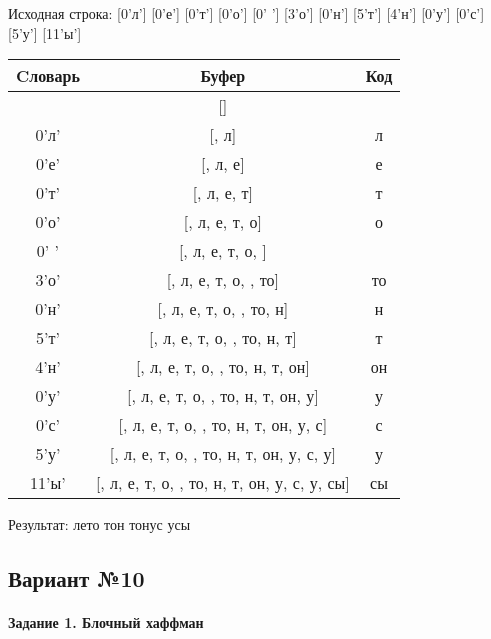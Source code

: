 \documentclass[a4paper, 12pt]{article}
\begin{document}
Исходная строка: [0'л'] [0'е'] [0'т'] [0'о'] [0' '] [3'о'] [0'н'] [5'т'] [4'н'] [0'у'] [0'с'] [5'у'] [11'ы']\\
\begin{table}[h!]
\centering
\begin{tabular}{|c|c|c|}
\hline
 Cловарь & Буфер & Код  \\ \hline
 & [] & 
\\ \hline
0'л' & [, л] & л
\\ \hline
0'е' & [, л, е] & е
\\ \hline
0'т' & [, л, е, т] & т
\\ \hline
0'о' & [, л, е, т, о] & о
\\ \hline
0' ' & [, л, е, т, о,  ] &  
\\ \hline
3'о' & [, л, е, т, о,  , то] & то
\\ \hline
0'н' & [, л, е, т, о,  , то, н] & н
\\ \hline
5'т' & [, л, е, т, о,  , то, н,  т] &  т
\\ \hline
4'н' & [, л, е, т, о,  , то, н,  т, он] & он
\\ \hline
0'у' & [, л, е, т, о,  , то, н,  т, он, у] & у
\\ \hline
0'с' & [, л, е, т, о,  , то, н,  т, он, у, с] & с
\\ \hline
5'у' & [, л, е, т, о,  , то, н,  т, он, у, с,  у] &  у
\\ \hline
11'ы' & [, л, е, т, о,  , то, н,  т, он, у, с,  у, сы] & сы
\\ \hline
\end{tabular}
\end{table}

Результат: лето тон тонус усы
\pagebreak
\subsection{Вариант №10}
\paragraph{Задание 1. Блочный хаффман \\}
\end{document}
